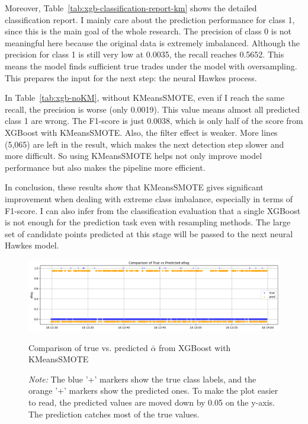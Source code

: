 Moreover, Table~\ref{tab:xgb-classification-report-km} shows the detailed classification report. I mainly care about the prediction performance for class 1, since this is the main goal of the whole research. The precision of class 0 is not meaningful here because the original data is extremely imbalanced. Although the precision for class 1 is still very low at 0.0035, the recall reaches 0.5652. This means the model finds sufficient true trades under the model with oversampling. This prepares the input for the next step: the neural Hawkes process.

In Table~\ref{tab:xgb-noKM}, without KMeansSMOTE, even if I reach the same recall, the precision is worse (only 0.0019). This value means almost all predicted class 1 are wrong. The F1-score is just 0.0038, which is only half of the score from XGBoost with KMeansSMOTE. Also, the filter effect is weaker. More lines (5,065) are left in the result, which makes the next detection step slower and more difficult. So using KMeansSMOTE helps not only improve model performance but also makes the pipeline more efficient.

In conclusion, these results show that KMeansSMOTE gives significant improvement when dealing with extreme class imbalance, especially in terms of F1-score. I can also infer from the classification evaluation that a single XGBoost is not enough for the prediction task even with resampling methods. The large set of candidate points predicted at this stage will be passed to the next neural Hawkes model. 

\begin{figure}[htbp]
    \centering
    \includegraphics[width=\textwidth]{figures/aflag_XGBoost_181330.png}
    \caption{Comparison of true vs. predicted $\bar{\alpha}$ from XGBoost with KMeansSMOTE} 
    \caption*{\textit{Note:} The blue '+' markers show the true class labels, and the orange '+' markers show the predicted ones. To make the plot easier to read, the predicted values are moved down by 0.05 on the y-axis.  The prediction catches most of the true values.
    }
    \label{fig:xgb-pred-vs-true-km}
\end{figure}

